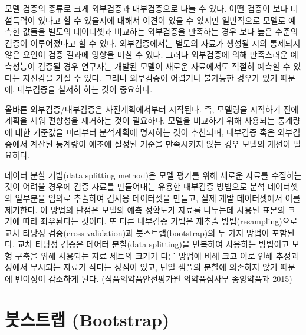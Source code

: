 \documentclass[
  10pt,
  krantz2,
  a4paper]{krantz}
\theoremstyle{definition}
\theoremstyle{definition}
\theoremstyle{definition}
\theoremstyle{remark}
\begin{document}
모델 검증의 종류로 크게 외부검증과 내부검증으로 나눌 수 있다. 어떤 검증이 보다 더 설득력이 있다고 할 수 있을지에 대해서 이견이 있을 수 있지만 일반적으로 모델로 예측한 값들을 별도의 데이터셋과 비교하는 외부검증을 만족하는 경우 보다 높은 수준의 검증이 이루어졌다고 할 수 있다. 외부검증에서는 별도의 자료가 생성될 시의 통제되지 않은 요인이 검증 결과에 영향을 미칠 수 있다. 그러나 외부검증에 의해 만족스러운 예측성능이 검증될 경우 연구자는 개발된 모델이 새로운 자료에서도 적절히 예측할 수 있다는 자신감을 가질 수 있다. 그러나 외부검증이 어렵거나 불가능한 경우가 있기 때문에, 내부검증을 철저히 하는 것이 중요하다.

올바른 외부검증/내부검증은 사전계획에서부터 시작된다. 즉, 모델링을 시작하기 전에 계획을 세워 편향성을 제거하는 것이 필요하다. 모델을 비교하기 위해 사용되는 통계량에 대한 기준값을 미리부터 분석계획에 명시하는 것이 추천되며, 내부검증 혹은 외부검증에서 계산된 통계량이 애초에 설정된 기준을 만족시키지 않는 경우 모델의 개선이 필요하다.

데이터 분할 기법(data splitting method)은 모델 평가를 위해 새로운 자료를 수집하는 것이 어려울 경우에 검증 자료를 만들어내는 유용한 내부검증 방법으로 분석 데이터셋의 일부분을 임의로 추출하여 검사용 데이터셋을 만들고, 실제 개발 데이터셋에서 이를 제거한다. 이 방법의 단점은 모델의 예측 정확도가 자료를 나누는데 사용된 표본의 크기에 따라 좌우된다는 것이다. 또 다른 내부검증 기법은 재추출 방법(resampling)으로 교차 타당성 검증(cross-validation)과 붓스트랩(bootstrap)의 두 가지 방법이 포함된다. 교차 타당성 검증은 데어터 분할(data splitting)을 반복하여 사용하는 방법이고 모형 구축을 위해 사용되는 자료 세트의 크기가 다른 방법에 비해 크고 이로 인해 추정과정에서 무시되는 자료가 작다는 장점이 있고, 단일 샘플의 분할에 의존하지 않기 때문에 변이성이 감소하게 된다. (식품의약품안전평가원 의약품심사부 종양약품과 \protect\hyperlink{ref-poppk}{2015})

\hypertarget{uxbd93uxc2a4uxd2b8uxb7a9-bootstrap}{%
\section{\texorpdfstring{붓스트랩 (Bootstrap)}{붓스트랩 (Bootstrap)}}\label{uxbd93uxc2a4uxd2b8uxb7a9-bootstrap}}
\end{document}
